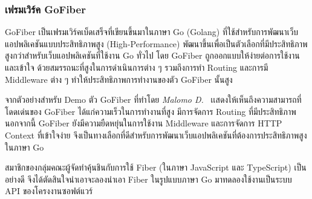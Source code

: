 \documentclass[12pt,one side,openright,a4paper]{cpe-thesis-th}
\newcommand{\thaijustify}[1]{%
  \par\hspace{30pt}\justifying
  #1
}
\begin{document}
        \subsubsection{เฟรมเวิร์ค GoFiber}
            \thaijustify{
                GoFiber เป็นเฟรมเวิร์คเบ็ดเสร็จที่เขียนขึ้นมาในภาษา Go (Golang) ที่ใช้สำหรับการพัฒนาเว็บแอปพลิเคชันแบบประสิทธิภาพสูง (High-Performance) พัฒนาขึ้นเพื่อเป็นตัวเลือกที่มีประสิทธิภาพสูงกว่าสำหรับเว็บแอปพลิเคชันที่ใช้งาน Go ทั่วไป โดย GoFiber ถูกออกแบบให้ง่ายต่อการใช้งานและเข้าใจ ด้วยสมรรถนะที่สูงในการดำเนินการต่าง ๆ รวมถึงการทำ Routing และการมี Middleware ต่าง ๆ ทำให้ประสิทธิภาพการทำงานของตัว GoFiber นั้นสูง~\cite{gofiber}
            }
            \thaijustify{
                จากตัวอย่างสำหรับ Demo ตัว GoFiber ที่ทำโดย \textit{Malomo D.}~\cite{malomo20fiber} เเสดงให้เห็นถึงความสามารถที่โดดเด่นของ GoFiber ได้แก่ความเร็วในการทำงานที่สูง มีการจัดการ Routing ที่มีประสิทธิภาพ นอกจากนี้ GoFiber ยังมีความยืดหยุ่นในการใช้งาน Middleware และการจัดการ HTTP Context ที่เข้าใจง่าย จึงเป็นทางเลือกที่ดีสำหรับการพัฒนาเว็บแอปพลิเคชันที่ต้องการประสิทธิภาพสูงในภาษา Go
            }
            \thaijustify{
                สมาชิกของกลุ่มคณะผู้จัดทำคุ้นชินกับการใช้ Fiber (ในภาษา JavaScript และ TypeScript) เป็นอย่างดี จึงได้ตัดสินใจนำเอาจะลองนำเอา Fiber ในรูปแบบภาษา Go มาทดลองใช้งานเป็นระบบ API ของโครงงานซอฟต์แวร์
            }
\end{document}
